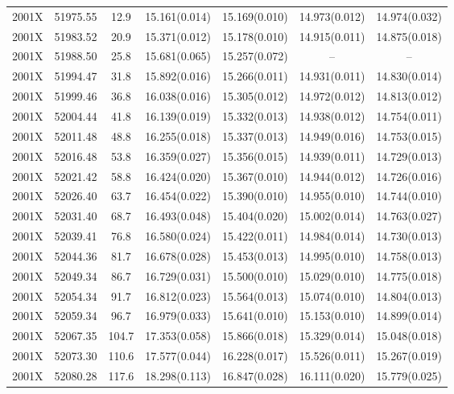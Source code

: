 \begin{table*}
\begin{tabular}{ccccccc}
2001X	  & 51975.55	 & 12.9	& 15.161(0.014)	 & 15.169(0.010)	 & 14.973(0.012)	 & 14.974(0.032) \\ 
2001X	  & 51983.52	 & 20.9	& 15.371(0.012)	 & 15.178(0.010)	 & 14.915(0.011)	 & 14.875(0.018) \\ 
2001X	  & 51988.50	 & 25.8	& 15.681(0.065)	 & 15.257(0.072)	 & --	 & -- \\ 
2001X	  & 51994.47	 & 31.8	& 15.892(0.016)	 & 15.266(0.011)	 & 14.931(0.011)	 & 14.830(0.014) \\ 
2001X	  & 51999.46	 & 36.8	& 16.038(0.016)	 & 15.305(0.012)	 & 14.972(0.012)	 & 14.813(0.012) \\ 
2001X	  & 52004.44	 & 41.8	& 16.139(0.019)	 & 15.332(0.013)	 & 14.938(0.012)	 & 14.754(0.011) \\ 
2001X	  & 52011.48	 & 48.8	& 16.255(0.018)	 & 15.337(0.013)	 & 14.949(0.016)	 & 14.753(0.015) \\ 
2001X	  & 52016.48	 & 53.8	& 16.359(0.027)	 & 15.356(0.015)	 & 14.939(0.011)	 & 14.729(0.013) \\ 
2001X	  & 52021.42	 & 58.8	& 16.424(0.020)	 & 15.367(0.010)	 & 14.944(0.012)	 & 14.726(0.016) \\ 
2001X	  & 52026.40	 & 63.7	& 16.454(0.022)	 & 15.390(0.010)	 & 14.955(0.010)	 & 14.744(0.010) \\ 
2001X	  & 52031.40	 & 68.7	& 16.493(0.048)	 & 15.404(0.020)	 & 15.002(0.014)	 & 14.763(0.027) \\ 
2001X	  & 52039.41	 & 76.8	& 16.580(0.024)	 & 15.422(0.011)	 & 14.984(0.014)	 & 14.730(0.013) \\ 
2001X	  & 52044.36	 & 81.7	& 16.678(0.028)	 & 15.453(0.013)	 & 14.995(0.010)	 & 14.758(0.013) \\ 
2001X	  & 52049.34	 & 86.7	& 16.729(0.031)	 & 15.500(0.010)	 & 15.029(0.010)	 & 14.775(0.018) \\ 
2001X	  & 52054.34	 & 91.7	& 16.812(0.023)	 & 15.564(0.013)	 & 15.074(0.010)	 & 14.804(0.013) \\ 
2001X	  & 52059.34	 & 96.7	& 16.979(0.033)	 & 15.641(0.010)	 & 15.153(0.010)	 & 14.899(0.014) \\ 
2001X	  & 52067.35	 & 104.7	& 17.353(0.058)	 & 15.866(0.018)	 & 15.329(0.014)	 & 15.048(0.018) \\ 
2001X	  & 52073.30	 & 110.6	& 17.577(0.044)	 & 16.228(0.017)	 & 15.526(0.011)	 & 15.267(0.019) \\ 
2001X	  & 52080.28	 & 117.6	& 18.298(0.113)	 & 16.847(0.028)	 & 16.111(0.020)	 & 15.779(0.025) \\ 

\end{tabular}
\end{table*}
